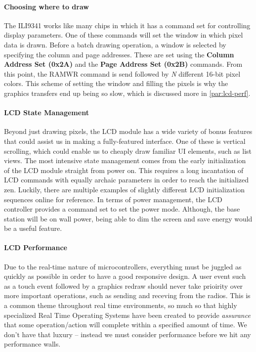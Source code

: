 \paragraph{Choosing where to draw}
The ILI9341 works like many chips in which it has a command set for controlling
display parameters. One of these commands will set the window in which pixel
data is drawn. Before a batch drawing operation, a window is selected by
specifying the column and page addresses. These are set using the
\textbf{Column Address Set (0x2A)} and the \textbf{Page Address Set (0x2B)}
commands. From this point, the RAMWR command is send followed by \emph{N}
different 16-bit pixel colors. This scheme of setting the window and filling
the pixels is why the graphics transfers end up being so slow, which is
discussed more in \autoref{par:lcd-perf}.

\paragraph{LCD State Management}
Beyond just drawing pixels, the LCD module has a wide variety of bonus features
that could assist us in making a fully-featured interface. One of these is
vertical scrolling, which could enable us to cheaply draw familiar UI elements,
such as list views. The most intensive state management comes from the early
initialization of the LCD module straight from power on. This requires a long
incantation of LCD commands with equally archaic parameters in order to reach
the initialized zen. Luckily, there are multiple examples of slightly different
LCD initialization sequences online for reference. In terms of power
management, the LCD controller provides a command set to set the power mode.
Although, the base station will be on wall power, being able to dim the screen
and save energy would be a useful feature.

\paragraph{LCD Performance}
\label{par:lcd-perf}
Due to the real-time nature of microcontrollers, everything must be juggled as
quickly as possible in order to have a good responsive design. A user event
such as a touch event followed by a graphics redraw should never take prioirity
over more important operations, such as sending and receving from the radios.
This is a common theme
throughout real time environments, so much so that highly specialized Real Time
Operating Systems have been created to provide \emph{assurance} that some
operation/action will complete within a specified amount of time. We don't have that luxury -- instead we must consider performance before we hit any performance walls.

